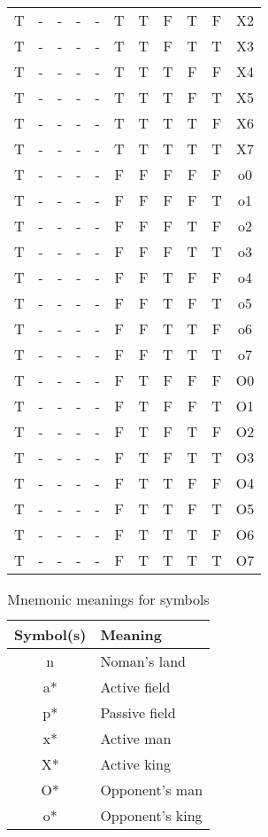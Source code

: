 \begin{table} [!ht]
\begin{center}
\begin{tabular}[hbt]{|c|c|c|c|c|c|c|c|c|c|c|}
T & - & - & - & - & T & T & F & T & F & X2 \\
T & - & - & - & - & T & T & F & T & T & X3 \\
T & - & - & - & - & T & T & T & F & F & X4 \\
T & - & - & - & - & T & T & T & F & T & X5 \\
T & - & - & - & - & T & T & T & T & F & X6 \\
T & - & - & - & - & T & T & T & T & T & X7 \\
T & - & - & - & - & F & F & F & F & F & o0 \\
T & - & - & - & - & F & F & F & F & T & o1 \\
T & - & - & - & - & F & F & F & T & F & o2 \\
T & - & - & - & - & F & F & F & T & T & o3 \\
T & - & - & - & - & F & F & T & F & F & o4 \\
T & - & - & - & - & F & F & T & F & T & o5 \\
T & - & - & - & - & F & F & T & T & F & o6 \\
T & - & - & - & - & F & F & T & T & T & o7 \\
T & - & - & - & - & F & T & F & F & F & O0 \\
T & - & - & - & - & F & T & F & F & T & O1 \\
T & - & - & - & - & F & T & F & T & F & O2 \\
T & - & - & - & - & F & T & F & T & T & O3 \\
T & - & - & - & - & F & T & T & F & F & O4 \\
T & - & - & - & - & F & T & T & F & T & O5 \\
T & - & - & - & - & F & T & T & T & F & O6 \\
T & - & - & - & - & F & T & T & T & T & O7 \\
\hline
\end{tabular}
\end{center}
\label{tab:symbols}
\end{table}
\newpage
\begin{table} [!hb]
\caption {Mnemonic meanings for  symbols}
\begin{center}
\begin{tabular}[hbt]{|c|l|} 
\hline
Symbol(s) & Meaning \\
\hline
n & Noman's land \\
a* & Active field \\	
p* & Passive field \\
x* & Active man \\
X* & Active king \\
O* & Opponent's man \\
o* & Opponent's king \\
\hline
\end{tabular}
\end{center}
\label{tab:mnemonic}
\end{table}


